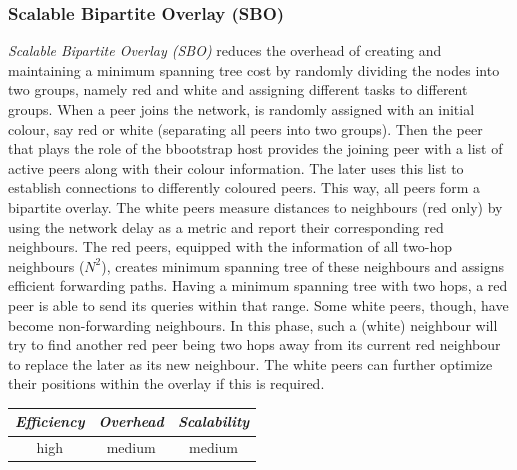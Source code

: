 \subsubsection{Scalable Bipartite Overlay (SBO)}
\emph{Scalable Bipartite Overlay (SBO)}
\cite{liu_bipartite_IPDPS,liu_bipartite_2007} reduces the overhead of creating
and maintaining a minimum spanning tree cost by randomly dividing the nodes into
two groups, namely red and white and assigning different tasks to different
groups. When a peer joins the network, is randomly assigned with an initial
colour, say red or white (separating all peers into two groups). Then the peer
that plays the role of the bbootstrap host provides the joining peer with a list
of active peers along with their colour information. The later uses this list to
establish connections to differently coloured peers. This way, all peers form a
bipartite overlay. The white peers measure distances to neighbours (red only) by
using the network delay as a metric and report their corresponding red
neighbours. The red peers, equipped with the information of all two-hop
neighbours ($N^2$), creates minimum spanning tree of these neighbours and
assigns efficient forwarding paths. Having a minimum spanning tree with two
hops, a red peer is able to send its queries within that range. Some white
peers, though, have become non-forwarding neighbours. In this phase, such a
(white) neighbour will try to find another red peer being two hops away from its
current red neighbour to replace the later as its new neighbour. The white peers
can further optimize their positions within the overlay if this is required.

%
%
%

\begin{center}
\begin{tabular}{ccc}
\emph{Efficiency} & \emph{Overhead} & \emph{Scalability} \\
\hline
high &
medium &
%
medium
\end{tabular}
\end{center}

